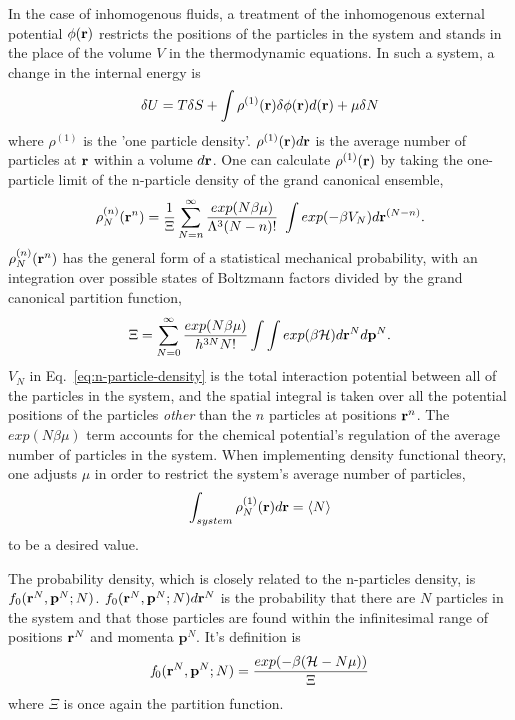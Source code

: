 In the case of inhomogenous fluids, a treatment of the inhomogenous
external potential $\phi(\textbf{r})$ restricts the positions of the
particles in the system and stands in the place of the volume $V$ in
the thermodynamic equations.  In such a system, a change in the
internal energy is
\begin{align}
  \delta U = T\delta S + \int \rho^{(1)}(\textbf{r})\delta \phi(\textbf{r})d(\textbf{r}) + \mu \delta N
\end{align}
where $\rho^{(1)}$ is the 'one particle density'.
$\rho^{(1)}(\textbf{r})d\textbf{r}$ is the average number of particles at $\textbf{r}$
within a volume $d\textbf{r}$.  One can calculate $\rho^{(1)}(\textbf{r})$ by taking
the one-particle limit of the n-particle density of the grand
canonical ensemble,
\begin{align}
  \label{eq:n-particle-density}
  \rho_N^{(n)}(\textbf{r}^n)=\frac{1}{\Xi}\sum^{\infty}_{N=n}\frac{exp(N\beta \mu)}{\Lambda^3 (N-n)!} \
  \int exp(-\beta V_N)d\textbf{r}^{(N-n)}.
\end{align}
$\rho_N^{(n)}(\textbf{r}^n)$ has the general form of a statistical mechanical
probability, with an integration over possible states of Boltzmann
factors divided by the grand canonical partition function,
\begin{align}
  \Xi = \sum_{N=0}^{\infty}\frac{exp(N\beta\mu)}{h^{3N}N!}\int\int exp(\beta \mathcal{H})d\textbf{r}^Nd\mathbf{p}^N.
\end{align}
$V_N$ in Eq.~\ref{eq:n-particle-density} is the total interaction
potential between all of the particles in the system, and the spatial
integral is taken over all the potential positions of the particles
\emph{other} than the $n$ particles at positions $\textbf{r}^n$.  The
$exp(N\beta \mu)$ term accounts for the chemical potential's
regulation of the average number of particles in the system.  When
implementing density functional theory, one adjusts $\mu$ in order to
restrict the system's average number of particles,
\begin{align}
  \int_{system} \rho_N^{(1)}(\textbf{r})d\textbf{r} = \langle N \rangle
\end{align}
to be a desired value.

The probability density, which is closely related to the n-particles
density, is $f_0(\textbf{r}^N,\mathbf{p}^N;N)$.
$f_0(\textbf{r}^N,\mathbf{p}^N;N)d\textbf{r}^N$ is the probability that there are
$N$ particles in the system and that those particles are found within
the infinitesimal range of positions $\textbf{r}^N$ and momenta
$\mathbf{p}^N$.  It's definition is
\begin{align}
  \label{eq:prob-density}
  \mathit{f}_0(\textbf{r}^N,\mathbf{p}^N;N) = \frac{exp(-\beta(\mathcal{H}-N\mu))}{\Xi}
\end{align}
where $\Xi$ is once again the partition
function.

